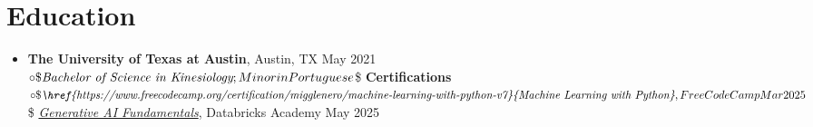 \documentclass[letterpaper,10pt]{article}
\begin{document}
\section*{Education}
\begin{itemize}
  \item[]
    \textbf{The University of Texas at Austin}, Austin, TX \hfill May 2021 \\$\circ\$
    \textit{Bachelor of Science in Kinesiology}; Minor in Portuguese \vspace{3pt} \\$\circ\$
    \textbf{Certifications} \\$\circ\$
    \textit{\href{https://www.freecodecamp.org/certification/migglenero/machine-learning-with-python-v7}{Machine Learning with Python}}, FreeCodeCamp \hfill Mar 2025 \\$\circ\$
    \textit{\href{https://credentials.databricks.com/052cc354-c947-42d8-81bb-40c38d77ace3}{Generative AI Fundamentals}}, Databricks Academy \hfill May 2025
\end{itemize}
\end{document}
